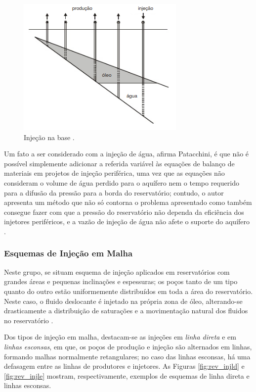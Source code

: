 \begin{figure}[!ht]
\centering
\includegraphics[width=.6\textwidth]{figs/revisao/revisao_injbas.png}
\caption{Inje\c{c}\~{a}o na base \cite[p. 566]{engres}.}
\label{fig:rev_injbas}
\end{figure}

Um fato a ser considerado com a inje\c{c}\~{a}o de \'{a}gua, afirma Patacchini, \'{e} que n\~{a}o \'{e} poss\'{i}vel simplemente adicionar a referida vari\'{a}vel \`{a}s equa\c{c}\~{o}es de balan\c{c}o de materiais em projetos de inje\c{c}\~{a}o perif\'{e}rica, uma vez que as equa\c{c}\~{o}es n\~{a}o consideram o volume de \'{a}gua perdido para o aqu\'{i}fero nem o tempo requerido para a difus\~{a}o da press\~{a}o para a borda do reservat\'{o}rio; contudo, o autor apresenta um m\'{e}todo que n\~{a}o s\'{o} contorna o problema apresentado como tamb\'{e}m consegue fazer com que a press\~{a}o do reservat\'{o}rio n\~{a}o dependa da efici\^{e}ncia dos injetores perif\'{e}ricos, e a vaz\~{a}o de inje\c{c}\~{a}o de \'{a}gua n\~{a}o afete o suporte do aqu\'{i}fero \cite{PATACCHINI2017720}.

\subsubsection{Esquemas de Inje\c{c}\~{a}o em Malha}
Neste grupo, se situam esquema de inje\c{c}\~{a}o aplicados em reservat\'{o}rios com grandes \'{a}reas e pequenas inclina\c{c}\~{o}es e espessuras; os po\c{c}os tanto de um tipo quanto do outro est\~{a}o uniformemente distribu\'{i}dos em toda a \'{a}rea do reservat\'{o}rio. Neste caso, o fluido deslocante \'{e} injetado na pr\'{o}pria zona de \'{o}leo, alterando-se drasticamente a distribui\c{c}\~{a}o de satura\c{c}\~{o}es e a movimenta\c{c}\~{a}o natural dos fluidos no reservat\'{o}rio \cite[p. 567]{engres}.

Dos tipos de inje\c{c}\~{a}o em malha, destacam-se as inje\c{c}\~{o}es em \textit{linha direta} e em \textit{linhas esconsas}, em que, os po\c{c}os de produ\c{c}\~{a}o e inje\c{c}\~{a}o s\~{a}o alternados em linhas, formando malhas normalmente retangulares; no caso das linhas esconsas, h\'{a} uma defasagem entre as linhas de produtores e injetores. As Figuras \ref{fig:rev_injld} e \ref{fig:rev_injle} mostram, respectivamente, exemplos de esquemas de linha direta e linhas esconsas.

